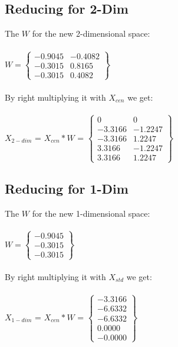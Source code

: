 \subsection{Reducing for 2-Dim}
The $W$ for the new 2-dimensional space:\\
\\
$W = \begin{Bmatrix}
-0.9045 & -0.4082\\
-0.3015 & 0.8165\\
-0.3015 & 0.4082
\end{Bmatrix}$\\
\\
By right multiplying it with $X_{cen}$ we get:\\ 
\\
$X_{2-dim}$ = $X_{cen}*W$ = $\begin{Bmatrix}
0 & 0\\
-3.3166 & -1.2247\\
-3.3166 & 1.2247\\
3.3166 & -1.2247\\
3.3166 & 1.2247
\end{Bmatrix}$
\\

\subsection{Reducing for 1-Dim}
The $W$ for the new 1-dimensional space:\\
\\
$W = \begin{Bmatrix}
-0.9045\\
-0.3015\\
-0.3015
\end{Bmatrix}$\\
\\
By right multiplying it with $X_{std}$ we get:\\ 
\\
$X_{1-dim}$ = $X_{cen}*W$ = $\begin{Bmatrix}
-3.3166\\
-6.6332\\
-6.6332\\
0.0000\\
-0.0000
\end{Bmatrix}$
\\



